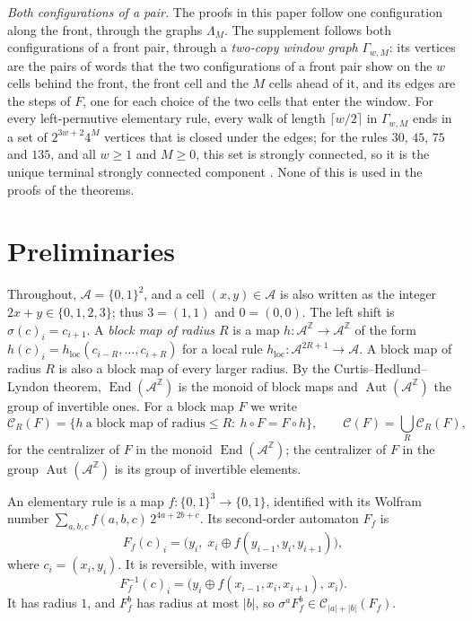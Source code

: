 \documentclass[11pt]{amsart}
\theoremstyle{definition}
\theoremstyle{remark}
\newcommand{\Z}{\mathbb{Z}}
\newcommand{\A}{\mathcal{A}}
\newcommand{\Aut}{\operatorname{Aut}}
\newcommand{\End}{\operatorname{End}}
\newcommand{\Cent}{\mathcal{C}}
\newcommand{\sh}{\sigma}
\begin{document}
\emph{Both configurations of a pair.} The proofs in this paper follow one configuration along the front, through the graphs $\Lambda_M$. The supplement \cite{PaperBsupp} follows both configurations of a front pair, through a \emph{two-copy window graph} $\Gamma_{w,M}$: its vertices are the pairs of words that the two configurations of a front pair show on the $w$ cells behind the front, the front cell and the $M$ cells ahead of it, and its edges are the steps of $F$, one for each choice of the two cells that enter the window. For every left-permutive elementary rule, every walk of length $\lceil w/2\rceil$ in $\Gamma_{w,M}$ ends in a set of $2^{3w+2}4^M$ vertices that is closed under the edges; for the rules $30$, $45$, $75$ and $135$, and all $w\ge1$ and $M\ge0$, this set is strongly connected, so it is the unique terminal strongly connected component \cite[Theorem~3.1 and Proposition~8.2]{PaperBsupp}. None of this is used in the proofs of the theorems.

\section{Preliminaries}\label{sec:prelim}

Throughout, $\A=\{0,1\}^2$, and a cell $(x,y)\in\A$ is also written as the integer $2x+y\in\{0,1,2,3\}$; thus $3=(1,1)$ and $0=(0,0)$. The left shift is $\sh(c)_i=c_{i+1}$. A \emph{block map of radius $R$} is a map $h\colon\A^{\Z}\to\A^{\Z}$ of the form $h(c)_i=h_{\mathrm{loc}}(c_{i-R},\dots,c_{i+R})$ for a local rule $h_{\mathrm{loc}}\colon\A^{2R+1}\to\A$. A block map of radius $R$ is also a block map of every larger radius. By the Curtis--Hedlund--Lyndon theorem, $\End(\A^{\Z})$ is the monoid of block maps and $\Aut(\A^{\Z})$ the group of invertible ones. For a block map $F$ we write
\[
\Cent_R(F)=\{h\ \text{a block map of radius}\le R:\ h\circ F=F\circ h\},\qquad \Cent(F)=\bigcup_R\Cent_R(F),
\]
for the centralizer of $F$ in the monoid $\End(\A^{\Z})$; the centralizer of $F$ in the group $\Aut(\A^{\Z})$ is its group of invertible elements.

An elementary rule is a map $f\colon\{0,1\}^3\to\{0,1\}$, identified with its Wolfram number $\sum_{a,b,c}f(a,b,c)\,2^{4a+2b+c}$. Its second-order automaton $F_f$ is
\begin{equation}\label{eq:F}
F_f(c)_i=\bigl(y_i,\;x_i\oplus f(y_{i-1},y_i,y_{i+1})\bigr),
\end{equation}
where $c_i=(x_i,y_i)$. It is reversible, with inverse
\begin{equation}\label{eq:Finv}
F_f^{-1}(c)_i=\bigl(y_i\oplus f(x_{i-1},x_i,x_{i+1}),\,x_i\bigr).
\end{equation}
It has radius $1$, and $F_f^b$ has radius at most $|b|$, so $\sh^aF_f^b\in\Cent_{|a|+|b|}(F_f)$.
\end{document}
